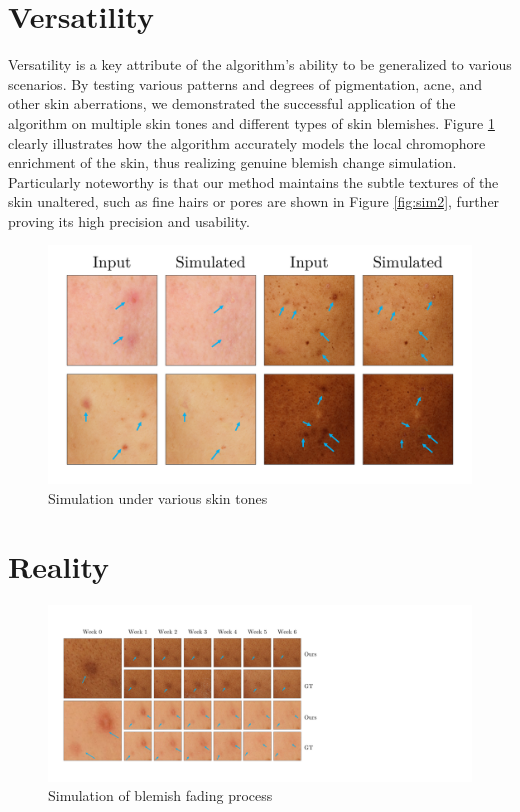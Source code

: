 \begin{spacing}{1.5}
\section{Versatility}
Versatility is a key attribute of the algorithm's ability to be generalized to various scenarios. By testing various patterns and degrees of pigmentation, acne, and other skin aberrations, we demonstrated the successful application of the algorithm on multiple skin tones and different types of skin blemishes. Figure \ref{fig:sim1} clearly illustrates how the algorithm accurately models the local chromophore enrichment of the skin, thus realizing genuine blemish change simulation. Particularly noteworthy is that our method maintains the subtle textures of the skin unaltered, such as fine hairs or pores are shown in Figure \ref{fig:sim2}, further proving its high precision and usability.
\begin{figure}[t]
    \centering
    \includegraphics[width=\columnwidth]{Chapter5/img_comp4.pdf}
    \caption{Simulation under various skin tones}
    \label{fig:sim1}
\end{figure}

\section{Reality}
\begin{figure}[t!]
    \centering
        \includegraphics[width=\columnwidth]{Chapter5/forward3.pdf}
        \caption{Simulation of blemish fading process}


\end{figure}
\end{spacing}
